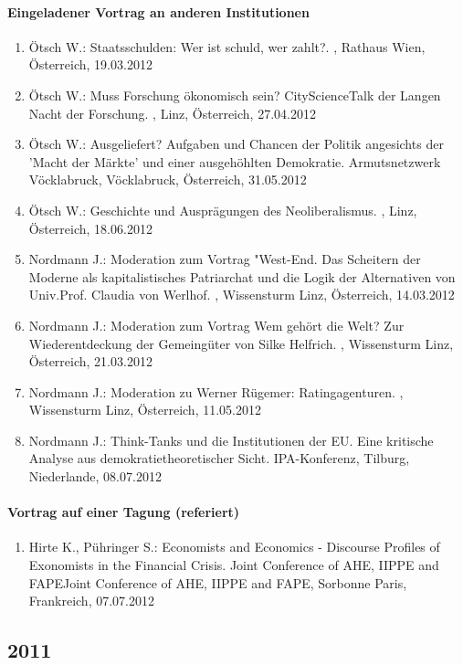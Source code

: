 \paragraph{Eingeladener Vortrag an anderen Institutionen}
\begin{enumerate}
	\item Ötsch W.: Staatsschulden: Wer ist schuld, wer zahlt?. , Rathaus Wien, Österreich, 19.03.2012
	\item Ötsch W.: Muss Forschung ökonomisch sein? CityScienceTalk der Langen Nacht der Forschung. , Linz, Österreich, 27.04.2012
	\item Ötsch W.: Ausgeliefert? Aufgaben und Chancen der Politik angesichts der 'Macht der Märkte' und einer ausgehöhlten Demokratie. Armutsnetzwerk Vöcklabruck, Vöcklabruck, Österreich, 31.05.2012
	\item Ötsch W.: Geschichte und Ausprägungen des Neoliberalismus. , Linz, Österreich, 18.06.2012
	\item Nordmann J.: Moderation zum Vortrag "West-End. Das Scheitern der Moderne als kapitalistisches Patriarchat und die Logik der Alternativen von Univ.Prof. Claudia von Werlhof. , Wissensturm Linz, Österreich, 14.03.2012
	\item Nordmann J.: Moderation zum Vortrag \glqq Wem gehört die Welt? Zur Wiederentdeckung der Gemeingüter\grqq{} von Silke Helfrich. , Wissensturm Linz, Österreich, 21.03.2012
	\item Nordmann J.: Moderation zu Werner Rügemer: Ratingagenturen. , Wissensturm Linz, Österreich, 11.05.2012
	\item Nordmann J.: Think-Tanks und die Institutionen der EU. Eine kritische Analyse aus demokratietheoretischer Sicht. IPA-Konferenz, Tilburg, Niederlande, 08.07.2012
\end{enumerate}
\paragraph{Vortrag auf einer Tagung (referiert)}
\begin{enumerate}
	\item Hirte K., Pühringer S.: Economists and Economics - Discourse Profiles of Exonomists in the Financial Crisis. Joint Conference of AHE, IIPPE and FAPEJoint Conference of AHE, IIPPE and FAPE, Sorbonne Paris, Frankreich, 07.07.2012
\end{enumerate}
\subsection*{2011}
